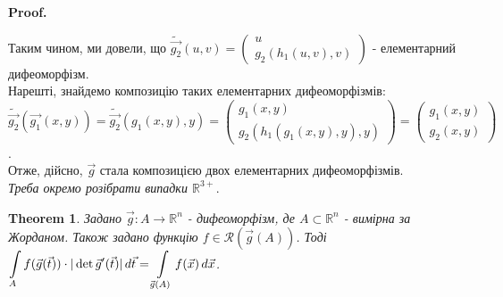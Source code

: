 \documentclass[a4paper, 10pt]{article}
\makeatletter
\def\huge{\displaystyle}
\def\qed{$\blacksquare$}
\theoremstyle{theoremdd}
\newtheorem{theorem}{Theorem}[subsection]
\theoremstyle{theoremdd}
\theoremstyle{theoremdd}
\theoremstyle{theoremdd}
\theoremstyle{theoremdd}
\theoremstyle{theoremdd}
\theoremstyle{theoremdd}
\theoremstyle{theoremdd}
\theoremstyle{theoremdd}
\theoremstyle{theoremdd}
\theoremstyle{theoremdd}
\theoremstyle{theoremdd}
\theoremstyle{theoremdd}
\theoremstyle{theoremdd}
\theoremstyle{theoremdd}
\renewenvironment{proof}[1][Proof.\\]{\par
\pushQED{\hfill \qed}%
\normalfont \topsep6\p@\@plus6\p@\relax
\trivlist
\item\relax
{\bfseries
#1\@addpunct{.}}\hspace\labelsep\ignorespaces
}{%
\popQED\endtrivlist\@endpefalse
}
\makeatother
\begin{document}
\begin{proof}
Таким чином, ми довели, що $\tilde{\vec{g_2}}(u,v) = \begin{pmatrix}
u \\ g_2(h_1(u,v),v)
\end{pmatrix}$ - елементарний дифеоморфізм.\\
Нарешті, знайдемо композицію таких елементарних дифеоморфізмів:\\
$\tilde{\vec{g_2}}(\vec{g_1}(x,y)) = \tilde{\vec{g_2}}(g_1(x,y),y) = \begin{pmatrix}
g_1(x,y) \\
g_2(h_1(g_1(x,y),y),y)
\end{pmatrix} = \begin{pmatrix}
g_1(x,y) \\ g_2(x,y)
\end{pmatrix}$.\\
Отже, дійсно, $\vec{g}$ стала композицією двох елементарних дифеоморфізмів.
\bigskip \\
\textit{Треба окремо розібрати випадки $\mathbb{R}^{3+}$}.
\end{proof}
\fi

\begin{theorem}
Задано $\vec{g}: A \to \mathbb{R}^n$ - дифеоморфізм, де $A \subset \mathbb{R}^n$ - вимірна за Жорданом. Також задано функцію $f \in \mathcal{R}(\vec{g}(A))$. Тоді\\
$\huge\int\displaylimits_A f(\vec{g}(\vec{t})) \cdot |\det \vec{g}'(\vec{t})| \,d\vec{t} = \int\displaylimits_{\vec{g}(A)} f(\vec{x}) \,d\vec{x}$.
\end{theorem}
\end{document}
